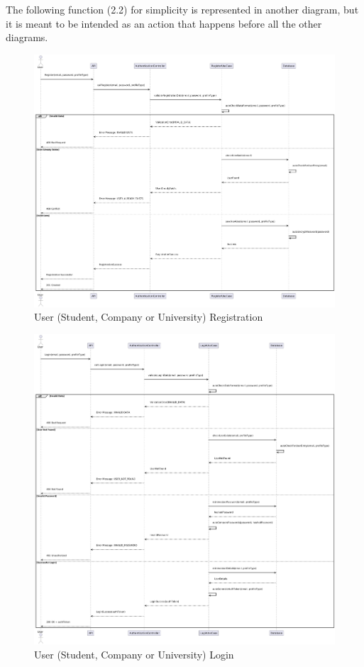 The following function (2.2) for simplicity is represented in another diagram, but it is meant to be intended as an action that happens before all the other diagrams.
\vspace{5mm}

\begin{figure}[ht!]
    \includegraphics[scale=0.29]{Images/ImagesSequenceDiagram/RegisterAuthentication.png}
    \caption{User (Student, Company or University) Registration}
\end{figure}

\newpage

\begin{figure}[ht!]
    \centering
    \includegraphics[scale=0.27]{Images/ImagesSequenceDiagram/LoginAuthentication.png}
    \caption{User (Student, Company or University) Login}
\end{figure}

